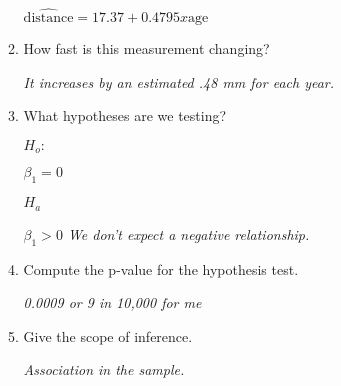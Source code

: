 \begin{enumerate}
\begin{enumerate}
\begin{key}
  {\it $\widehat{\mbox{distance}} = 17.37 + 0.4795 x \mbox{age}$}
\end{key}

     \item How fast is this measurement changing?
\begin{students}
  \vspace{1.5cm}
\end{students} 

\begin{key}
  {\it It increases by an estimated .48 mm for each year.}
\end{key}

     \item What hypotheses are we testing?

  $H_o:$
\begin{students}
 \vspace{1cm}      
\end{students}
\begin{key}
  {\it  $\beta_1 = 0$   }
\end{key}

  $H_a$
\begin{students}
 \vspace{1cm}      
\end{students}
\begin{key}
  {\it  $\beta_1 > 0$   We don't expect a negative relationship.}
\end{key}

     \item Compute the p-value for the hypothesis test.
\begin{students}
  \vspace{1.5cm}
\end{students} 

\begin{key}
  {\it 0.0009  or 9 in 10,000 for me}
\end{key}

     \item Give the scope of inference.
\begin{students}
  \vspace{1.5cm}
\end{students} 

\begin{key}
  {\it Association in the sample.}
\end{key}

     \end{enumerate}


\end{enumerate}
